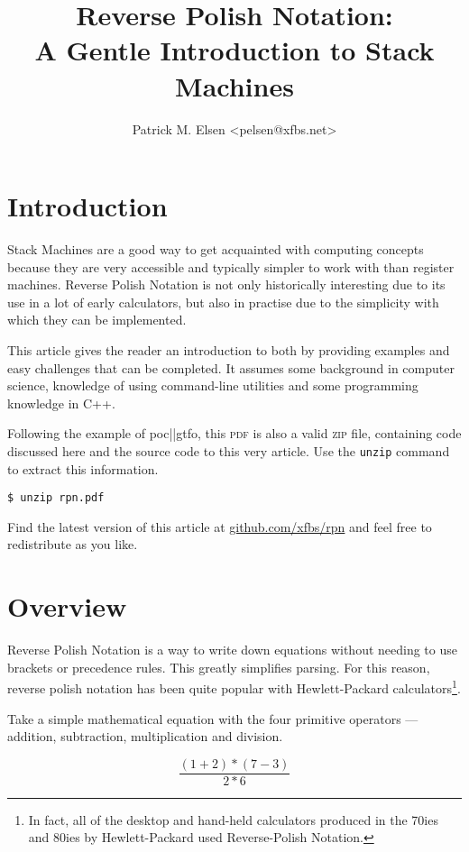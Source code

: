 \documentclass[a4paper,twocolumn]{article}
\title{Reverse Polish Notation:\\A Gentle Introduction to Stack Machines}
\author{Patrick M. Elsen <pelsen@xfbs.net>}
\date{}
\begin{document}
\maketitle
\tableofcontents

\section*{Introduction}

Stack Machines are a good way to get acquainted with computing concepts because they are very accessible and typically simpler to work with than register machines. Reverse Polish Notation is not only historically interesting due to its use in a lot of early calculators, but also in practise due to the simplicity with which they can be implemented.

This article gives the reader an introduction to both by providing examples and easy challenges that can be completed. It assumes some background in computer science, knowledge of using command-line utilities and some programming knowledge in C++.

Following the example of  poc||gtfo, this \textsc{pdf} is also a valid \textsc{zip} file, containing code discussed here and the source code to this very article. Use the \verb|unzip| command to extract this information.

\begin{verbatim}
$ unzip rpn.pdf
\end{verbatim}
Find the latest version of this article at \href{https://github.com/xfbs/rpn}{github.com/xfbs/rpn} and feel free to redistribute as you like.

\section{Overview}

Reverse Polish Notation is a way to write down equations without needing to use brackets or precedence rules. This greatly simplifies parsing. For this reason, reverse polish notation has been quite popular with Hewlett-Packard calculators\cite{website:hprpn}\footnote{In fact, all of the desktop and hand-held calculators produced in the 70ies and 80ies by  Hewlett-Packard used Reverse-Polish Notation.}.

Take a simple mathematical equation with the four primitive operators — addition, subtraction, multiplication and division.

\begin{equation}\label{eqn:simpleeqn}
  \frac{(1 + 2) * (7 - 3)}{2 * 6}
\end{equation}
\end{document}
